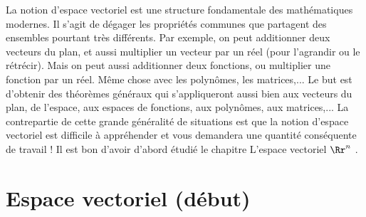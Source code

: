 \documentclass[class=report,crop=false]{standalone}
\begin{document}












\bigskip
\bigskip


La notion d'espace vectoriel est une structure fondamentale des mathématiques modernes.
Il s'agit de dégager les propriétés communes que partagent des ensembles pourtant très différents.
Par exemple, on peut additionner deux vecteurs du plan, et aussi multiplier un vecteur par un réel
(pour l'agrandir ou le rétrécir). Mais on peut aussi additionner deux fonctions, ou multiplier une fonction
par un réel. Même chose avec les polynômes, les matrices,...
Le  but est d'obtenir des théorèmes généraux qui s'appliqueront aussi bien aux vecteurs du plan,
de l'espace, aux espaces de fonctions, aux polynômes, aux matrices,...
La contrepartie de cette grande généralité de situations est que la notion
d'espace vectoriel est difficile à appréhender et vous demandera une quantité conséquente de travail !
Il est bon d'avoir d'abord étudié le chapitre \og L'espace vectoriel $\Rr^n$ \fg.




\section{Espace vectoriel (début)}


\end{document}
